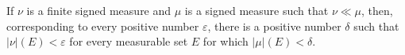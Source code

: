 If $\nu$ is a finite signed measure and $\mu$ is a signed measure such that $\nu \ll \mu$, then, corresponding to every positive number $\varepsilon$, there is a positive number $\delta$ such that $|\nu|(E) < \varepsilon$ for every measurable set $E$ for which $|\mu|(E) < \delta$.
